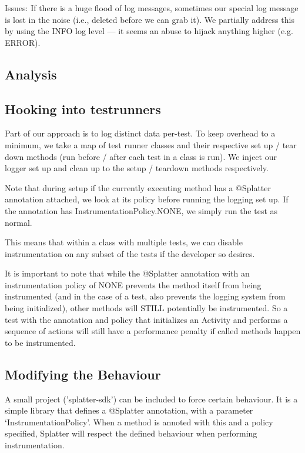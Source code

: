 Issues:
If there is a huge flood of log messages, sometimes our special log message is lost in the noise (i.e., deleted before we can grab it). We partially address this by using the INFO log level --- it seems an abuse to hijack anything higher (e.g. ERROR).

\subsection{Analysis}


\subsection{Hooking into testrunners}

Part of our approach is to log distinct data per-test. To keep overhead to a minimum, we take a map of test runner classes and their respective set up / tear down methods (run before / after each test in a class is run). We inject our logger set up and clean up to the setup / teardown methods respectively.

Note that during setup if the currently executing method has a @Splatter annotation attached, we look at its policy before running the logging set up. If the annotation has InstrumentationPolicy.NONE, we simply run the test as normal.

This means that within a class with multiple tests, we can disable instrumentation on any subset of the tests if the developer so desires.

It is important to note that while the @Splatter annotation with an instrumentation policy of NONE prevents the method itself from being instrumented (and in the case of a test, also prevents the logging system from being initialized), other methods will STILL potentially be instrumented. So a test with the annotation and policy that initializes an Activity and performs a sequence of actions will still have a performance penalty if called methods happen to be instrumented.

\subsection{Modifying the Behaviour}

A small project ('splatter-sdk') can be included to force certain behaviour. It is a simple library that defines a @Splatter annotation, with a parameter {\lq}InstrumentationPolicy{\rq}. When a method is annoted with this and a policy specified, Splatter will respect the defined behaviour when performing instrumentation.

